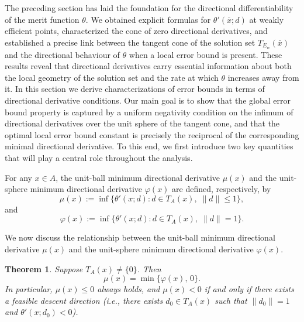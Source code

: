\documentclass[11pt]{article}
\newtheorem{theorem}{Theorem}[section]
\begin{document}
 The preceding section has laid the foundation for the directional differentiability of the merit function \(\theta\). We obtained explicit formulas for \(\theta'(\bar{x};d)\) at weakly efficient points, characterized the cone of zero directional derivatives, and established a precise link between the tangent cone of the solution set \(T_{E_w}(\bar{x})\) and the directional behaviour of \(\theta\) when a local error bound is present. These results reveal that directional derivatives carry essential information about both the local geometry of the solution set and the rate at which \(\theta\) increases away from it. In this section we   derive characterizations of error bounds in terms of directional derivative conditions. Our main goal is to show that the global error bound property is   captured by a uniform negativity condition on the infimum of directional derivatives over the unit sphere of the tangent cone, and that the optimal local error bound constant is precisely the reciprocal of the corresponding minimal directional derivative. To this end, we first introduce two key quantities that will play a central role throughout the analysis.

 For any \(x \in A\), the unit-ball minimum directional derivative \(\mu(x)\) and the unit-sphere minimum directional derivative \(\varphi(x)\) are defined, respectively, by
\[
\mu(x) := \inf\bigl\{ \theta'(x; d) : d \in T_A(x),\; \|d\| \le 1 \bigr\},
\]
and
\[
\varphi(x) := \inf\bigl\{ \theta'(x; d) : d \in T_A(x),\; \|d\| = 1 \bigr\}.
\]


 

We now discuss the relationship between the unit-ball minimum directional derivative \(\mu(x)\) and the unit-sphere minimum directional derivative \(\varphi(x)\).
 
\begin{theorem}\label{thm:mu-c}
	Suppose \(T_A(x)\neq\{0\}\). Then
	\[
	\mu(x)=\min\{\varphi(x),\,0\}.
	\]
 	In particular, \(\mu(x)\le 0\) always holds, and \(\mu(x)<0\) if and only if there exists a feasible descent direction (i.e., there exists \(d_0 \in T_A(x)\)  such that  \(\|d_0 \|=1\) and \(\theta'(x;d_0 )<0\)).
\end{theorem}
\end{document}
